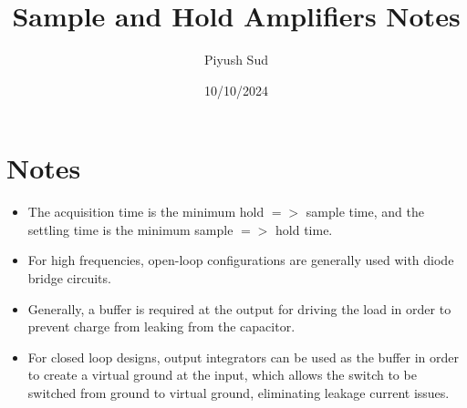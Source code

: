 \documentclass[12pt, letterpaper]{article}
\title{Sample and Hold Amplifiers Notes}
\author{Piyush Sud}
\date{10/10/2024}
\begin{document}
\maketitle

\pagebreak

\section{Notes}

\begin{itemize}
    \item The acquisition time is the minimum hold \(=>\) sample time, and the settling time is the minimum sample \(=>\) hold time.
    \item For high frequencies, open-loop configurations are generally used with diode bridge circuits.
    \item Generally, a buffer is required at the output for driving the load in order to prevent charge from leaking from the capacitor.
    \item For closed loop designs, output integrators can be used as the buffer in order to create a virtual ground at the input, which allows the switch to be switched from ground to virtual ground, eliminating leakage current issues.
\end{itemize}
\end{document}
